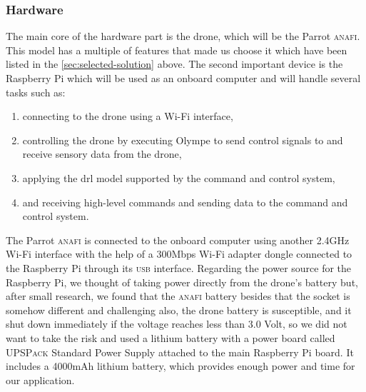 \documentclass[../main.tex]{subfiles}
\begin{document}
\subsubsection{Hardware}
The main core of the hardware part is the drone, 
which will be the Parrot \textsc{anafi}. This model 
has a multiple of features that made us choose it 
which have been listed in the 
\cref{sec:selected-solution} above. 
The second important device is the Raspberry Pi 
which will be used as an onboard computer and will 
handle several tasks such as:

\begin{enumerate}
    \item connecting to the drone 
        using a Wi-Fi interface,
    \item controlling the drone 
        by executing Olympe to send control signals 
        to and receive sensory data from the drone,
    \item applying the \gls{drl} model supported by 
        the command and control system,
    \item and receiving high-level commands and 
        sending data to the command and control system.
\end{enumerate}
 
The Parrot \textsc{anafi} is connected 
to the onboard computer using another 
2.4GHz Wi-Fi interface with the help of a 
300Mbps Wi-Fi adapter dongle connected to 
the Raspberry Pi through its \textsc{usb} interface. 
Regarding the power source for the Raspberry Pi, we thought of taking power directly from the drone's battery but, after small research, we found that the \textsc{anafi} battery besides that the socket is somehow different and challenging also, the drone battery is susceptible, and it shut down immediately if the voltage reaches less than 3.0 Volt, so we did not want to take the risk and used a 
lithium battery with a power board called 
\textsc{UPSPack} Standard Power Supply attached to 
the main Raspberry Pi board. It includes a 4000mAh 
lithium battery, which provides enough power 
and time for our application.
\end{document}
